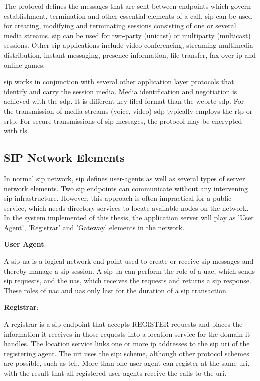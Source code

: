 \par The protocol defines the messages that are sent between endpoints which govern establishment, termination and other essential elements of a call. \gls{sip} can be used for creating, modifying and terminating sessions consisting of one or several media streams. \gls{sip} can be used for two-party (unicast) or multiparty (multicast) sessions. Other \gls{sip} applications include video conferencing, streaming multimedia distribution, instant messaging, presence information, file transfer, fax over \gls{ip} and online games.\cite{wiki:sip}

\par \gls{sip} works in conjunction with several other application layer protocols that identify and carry the session media. Media identification and negotiation is achieved with the \gls{sdp}. It is different key filed format than the \gls{webrtc} \gls{sdp}. For the transmission of media streams (voice, video) \gls{sdp} typically employs the \gls{rtp} or \gls{srtp}. For secure transmissions of \gls{sip} messages, the protocol may be encrypted with \gls{tls}.

\subsection{SIP Network Elements}
\noindent In normal \gls{sip} network, \gls{sip} defines user-agents as well as several types of server network elements. Two \gls{sip} endpoints can communicate without any intervening \gls{sip} infrastructure. However, this approach is often impractical for a public service, which needs directory services to locate available nodes on the network. In the system implemented of this thesis, the application server will play as 'User Agent', 'Registrar' and 'Gateway' elements in the network.

\noindent \textbf{User Agent}\cite{wiki:sip}:
\par A \gls{sip} \gls{ua} is a logical network end-point used to create or receive \gls{sip} messages and thereby manage a \gls{sip} session. A \gls{sip} \gls{ua} can perform the role of a \gls{uac}, which sends \gls{sip} requests, and the \gls{uas}, which receives the requests and returns a \gls{sip} response. These roles of \gls{uac} and \gls{uas} only last for the duration of a \gls{sip} transaction.

\noindent \textbf{Registrar}\cite{wiki:sip}:
\par A registrar is a \gls{sip} endpoint that accepts REGISTER requests and places the information it receives in those requests into a location service for the domain it handles. The location service links one or more \gls{ip} addresses to the \gls{sip} \gls{uri} of the registering agent. The \gls{uri} uses the sip: scheme, although other protocol schemes are possible, such as tel:. More than one user agent can register at the same \gls{uri}, with the result that all registered user agents receive the calls to the \gls{uri}.

